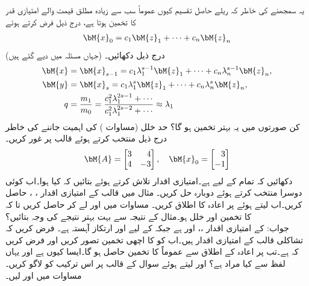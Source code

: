 \quad
یہ سمجھنے کی خاطر کہ ریلے حاصل تقسیم  کیوں عموماً  سب سے زیادہ مطلق قیمت والے امتیازی قدر  کا  تخمین  ہوتا ہے، درج ذیل فرض کرتے ہوئے
\begin{align*}
\bM{x}_0=c_1\bM{z}_1+\cdots+c_n\bM{z}_n
\end{align*}
(جہاں   مسئلہ  میں دیے گئے ہیں) درج ذیل دکھائیں۔
\begin{align*}
\bM{x}&=\bM{x}_{s-1}=c_1\lambda_1^{s-1}\bM{z}_1+\cdots+c_n\lambda_n^{s-1}\bM{z}_n,\\
\bM{y}&=\bM{x}_s=c_1\lambda_1^s\bM{z}_1+\cdots+c_n\lambda_n^s\bM{z}_n,\\
q&=\frac{m_1}{m_0}=\frac{c_1^2\lambda_1^{2s-1}+\cdots}{c_1^2\lambda_1^{2s-2}+\cdots}\approx \lambda_1
\end{align*}
کن صورتوں میں یہ بہتر تخمین ہو گا؟
\quad
حد خلل (مساوات ) کی اہمیت جاننے کی خاطر درج ذیل  منتخب کرتے ہوئے قالب  پر غور کریں۔ 
\begin{align*}
\bM{A}=\begin{bmatrix*}[r]3&4\\4&-3  \end{bmatrix*}, \quad \bM{x}_0=\begin{bmatrix*}[r] 3\\-1  \end{bmatrix*}
\end{align*}
دکھائیں کہ تمام  کے لیے  ہے۔امتیازی اقدار تلاش کرتے ہوئے بتائیں کہ کیا ہوا۔اب کوئی دوسرا  منتخب کرتے ہوئے دوبارہ حل کریں۔
\quad
مثال  میں قالب  کے امتیازی اقدار ، ،  حاصل کریں۔اب  لیتے ہوئے   پر اعادہ کا اطلاق کریں۔ مساوات  میں  اور  لے کر  حاصل کریں تا کہ  کا  تخمین  اور خلل  ہو۔مثال  کے نتیجہ سے بہت بہتر نتیجے کی وجہ بتائیں؟ \\
جواب:\quad
{} کے امتیازی اقدار ،،  اور  ہے جبکہ  کے لیے  اور ارتکاز آہستہ ہے۔ 
\quad
فرض کریں کہ تشاکلی قالب  کے امتیازی اقدار  ہیں۔اب  کو  کا اچھی تخمین تصور کریں   اور فرض کریں کہ  ہے۔تب  پر اعادہ کے اطلاق سے عموماً  کا تخمین حاصل ہو گا۔ایسا کیوں ہے اور یہاں لفظ  سے   کیا مراد ہے؟  اور  لیتے ہوئے سوال  کے قالب  پر اس ترکیب کو لاگو کریں۔ مساوات  میں  اور  لیں۔
